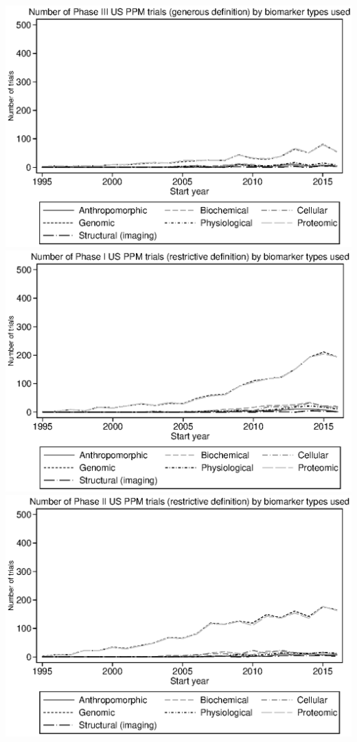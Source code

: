 \includegraphics{../figures/A04c-trial_count_by_type_g_ppm_phase_3_us.eps}
\includegraphics{../figures/A04d-trial_count_by_type_r_ppm_phase_1_us.eps}
\includegraphics{../figures/A04e-trial_count_by_type_r_ppm_phase_2_us.eps}
